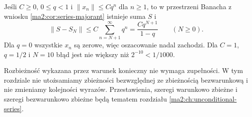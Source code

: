 \begin{przyklad}
\label{ma2:ex:series-geometric-bound}
Jeśli $C\ge0$, $0\le q<1$ i $\|x_n\|\le Cq^n$ dla $n\ge1$,
to w przestrzeni Banacha z wniosku
\ref{ma2:cor:series-majorant} istnieje suma $S$ i
\[
 \|S-S_N\|\le C\sum_{n=N+1}^\infty q^n
              =\frac{Cq^{N+1}}{1-q}\qquad(N\ge0).
\]
Dla $q=0$ wszystkie $x_n$ są zerowe, więc oszacowanie
nadal zachodzi. Dla $C=1$, $q=1/2$ i $N=10$ błąd jest
nie większy niż $2^{-10}<1/1000$.
\end{przyklad}

\begin{uwaga}
Rozbieżność wykazana przez warunek konieczny nie wymaga
zupełności. W tym rozdziale nie utożsamiamy zbieżności
bezwzględnej ze zbieżnością bezwarunkową i nie zmieniamy
kolejności wyrazów. Przestawienia, szeregi warunkowo zbieżne
i szeregi bezwarunkowo zbieżne będą tematem rozdziału
\ref{ma2:ch:unconditional-series}.
\end{uwaga}
